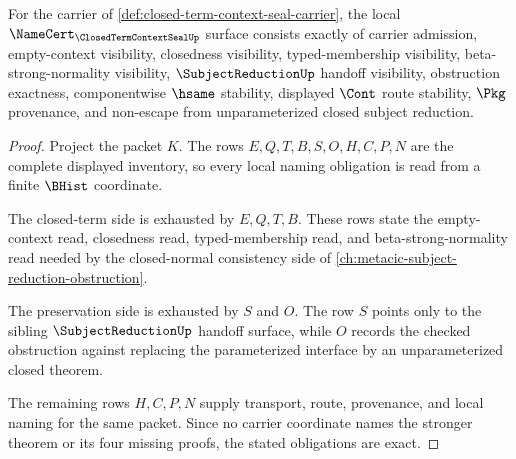 \begin{theorem}
\label{thm:closed-term-context-seal-namecert-obligations}
For the carrier of \autoref{def:closed-term-context-seal-carrier}, the local $\NameCert_{\ClosedTermContextSealUp}$ surface consists exactly of carrier admission, empty-context visibility, closedness visibility, typed-membership visibility, beta-strong-normality visibility, $\SubjectReductionUp$ handoff visibility, obstruction exactness, componentwise $\hsame$ stability, displayed $\Cont$ route stability, $\Pkg$ provenance, and non-escape from unparameterized closed subject reduction.
\end{theorem}
\begin{proof}
Project the packet $K$. The rows $E,Q,T,B,S,O,H,C,P,N$ are the complete displayed inventory, so every local naming obligation is read from a finite $\BHist$ coordinate.

The closed-term side is exhausted by $E,Q,T,B$. These rows state the empty-context read, closedness read, typed-membership read, and beta-strong-normality read needed by the closed-normal consistency side of \autoref{ch:metacic-subject-reduction-obstruction}.

The preservation side is exhausted by $S$ and $O$. The row $S$ points only to the sibling $\SubjectReductionUp$ handoff surface, while $O$ records the checked obstruction against replacing the parameterized interface by an unparameterized closed theorem.

The remaining rows $H,C,P,N$ supply transport, route, provenance, and local naming for the same packet. Since no carrier coordinate names the stronger theorem or its four missing proofs, the stated obligations are exact.
\end{proof}

